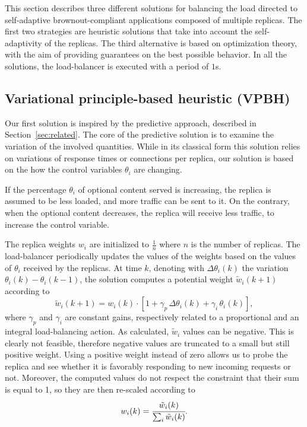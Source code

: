 This section describes three different solutions for balancing the
load directed to self-adaptive brownout-compliant applications
composed of multiple replicas. The first two strategies are heuristic
solutions that take into account the self-adaptivity of the
replicas. The third alternative is based on optimization theory, with
the aim of providing guarantees on the best possible behavior. In all
the solutions, the load-balancer is executed with a period of $1$s.

\subsection{Variational principle-based heuristic (VPBH)}

Our first solution is inspired by the predictive approach, described
in Section~\ref{sec:related}. The core of the predictive solution is
to examine the variation of the involved quantities. While in its
classical form this solution relies on variations of response times or
connections per replica, our solution is based on the how the control
variables $\theta_i$ are changing.

If the percentage $\theta_i$ of optional content served is increasing,
the replica is assumed to be less loaded, and more traffic can be sent
to it. On the contrary, when the optional content decreases, the
replica will receive less traffic, to increase the control variable.

The replica weights $w_i$ are initialized to $\frac{1}{n}$ where $n$
is the number of replicas. The load-balancer periodically updates the
values of the weights based on the values of $\theta_i$ received by
the replicas. At time $k$, denoting with $\Delta \theta_i (k)$ the
variation $\theta_i (k) - \theta_i (k-1)$, the solution computes a
potential weight $\tilde{w}_i(k+1)$ according to
\begin{equation}
  \tilde{w}_i(k+1) = w_i(k) \cdot 
\left[ 1 + \gamma_p \, \Delta \theta_i (k) + \gamma_i \, \theta_i (k) \right] ,
\label{eq:theta-diff}
\end{equation}
where $\gamma_p$ and $\gamma_i$ are constant gains, respectively
related to a proportional and an integral load-balancing action. As
calculated, $\tilde{w}_i$ values can be negative. This is clearly not
feasible, therefore negative values are truncated to a small but still
positive weight. Using a positive weight instead of zero allows us to
probe the replica and see whether it is favorably responding to new
incoming requests or not. Moreover, the computed values do not respect
the constraint that their sum is equal to 1, so they are then
re-scaled according to
\begin{equation}
  w_i (k) = \cfrac{\tilde{w}_i (k)}{\sum_i \tilde{w}_i (k)}.
\label{eq:theta-diff-rescale}
\end{equation}

